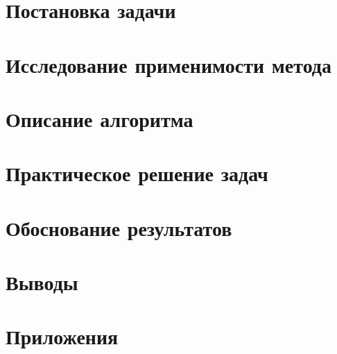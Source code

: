 \documentclass[main.tex]{subfiles}
\begin{document}
\section{Постановка задачи}

\section{Исследование применимости метода}

\section{Описание алгоритма}

\section{Практическое решение задач}

\section{Обоснование результатов}

\section{Выводы}

\section{Приложения}

\end{document}

